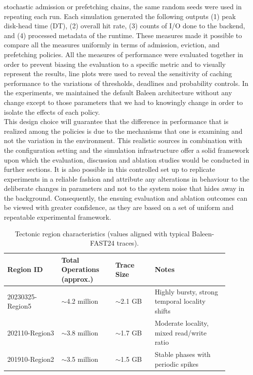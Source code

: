 \documentclass[sigconf]{acmart}
\begin{document}
{stochastic admission or prefetching chains, the same random seeds were used in repeating each run. Each simulation generated the following outputs (1) peak disk-head time (DT), (2) overall hit rate, (3) counts of I/O done to the backend, and (4) processed metadata of the runtime. These measures made it possible to compare all the measures uniformly in terms of admission, eviction, and prefetching policies. All the measures of performance were evaluated together in order to prevent biasing the evaluation to a specific metric and to visually represent the results, line plots were used to reveal the sensitivity of caching performance to the variations of thresholds, deadlines and probability controls. In the experiments, we maintained the default Baleen architecture without any change except to those parameters that we had to knowingly change in order to isolate the effects of each policy.\\\indent This design choice will guarantee that the difference in performance that is realized among the policies is due to the mechanisms that one is examining and not the variation in the environment. This realistic sources in combination with the configuration setting and the simulation infrastructure offer a solid framework upon which the evaluation, discussion and ablation studies would be conducted in further sections. It is also possible in this controlled set up to replicate experiments in a reliable fashion and attribute any alterations in behaviour to the deliberate changes in parameters and not to the system noise that hides away in the background. Consequently, the ensuing evaluation and ablation outcomes can be viewed with greater confidence, as they are based on a set of uniform and repeatable experimental framework.

\begin{table}[H]
\small
\caption{Tectonic region characteristics (values aligned with typical Baleen-FAST24 traces).}
\label{tab:regions}
\centering
{}
\begin{tabular}{
  p{0.22\linewidth}
  p{0.22\linewidth}
  p{0.16\linewidth}
  p{0.30\linewidth}}
\toprule
\rowcolor{gray!25}
\textbf{Region ID} &
\textbf{Total Operations (approx.)} &
\textbf{Trace Size} &
\textbf{Notes} \\
\midrule
20230325-Region5 & $\sim$4.2 million & $\sim$2.1 GB &
Highly bursty, strong temporal locality shifts \\
202110-Region3   & $\sim$3.8 million & $\sim$1.7 GB &
Moderate locality, mixed read/write ratio \\
201910-Region2   & $\sim$3.5 million & $\sim$1.5 GB &
Stable phases with periodic spikes \\
\bottomrule
\end{tabular}
\end{table}


}
\end{document}
